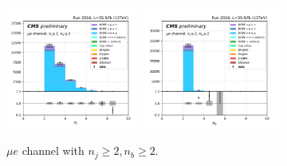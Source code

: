 \begin{figure}[ht]
    \includegraphics[width=0.4\textwidth]{chapters/Analysis/sectionPlots/figures/kinematics_pickles/emu/2b/emu_2b_nJets.pdf}
    \includegraphics[width=0.4\textwidth]{chapters/Analysis/sectionPlots/figures/kinematics_pickles/emu/2b/emu_2b_nBJets.pdf}
    
    \caption{$\mu e$ channel with $n_j\geq2, n_b\geq2$.}
\end{figure}

